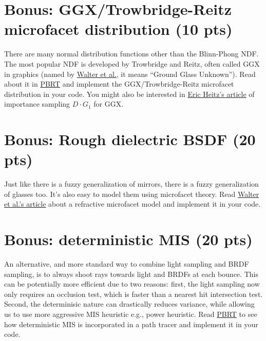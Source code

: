 \section{Bonus: GGX/Trowbridge-Reitz microfacet distribution (10 pts)}
There are many normal distribution functions other than the Blinn-Phong NDF. The most popular NDF is developed by Trowbridge and Reitz, often called GGX in graphics (named by \href{http://www.graphics.cornell.edu/~bjw/microfacetbsdf.pdf}{Walter et al.}, it means ``Ground Glass Unknown''). Read about it in \href{https://www.pbr-book.org/3ed-2018/Reflection_Models/Microfacet_Models#MicrofacetDistributionFunctions}{PBRT} and implement the GGX/Trowbridge-Reitz microfacet distribution in your code. You might also be interested in \href{https://jcgt.org/published/0007/04/01/}{Eric Heitz's article} of importance sampling $D \cdot G_1$ for GGX.

\section{Bonus: Rough dielectric BSDF (20 pts)}
Just like there is a fuzzy generalization of mirrors, there is a fuzzy generalization of glasses too. It's also easy to model them using microfacet theory. Read \href{http://www.graphics.cornell.edu/~bjw/microfacetbsdf.pdf}{Walter et al.'s article} about a refractive microfacet model and implement it in your code.

\section{Bonus: deterministic MIS (20 pts)}
An alternative, and more standard way to combine light sampling and BRDF sampling, is to always shoot rays towards light and BRDFs at each bounce. This can be potentially more efficient due to two reasons: first, the light sampling now only requires an occlusion test, which is faster than a nearest hit intersection test. Second, the determinisic nature can drastically reduces variance, while allowing us to use more aggressive MIS heuristic e.g., power heuristic. Read \href{https://www.pbr-book.org/3ed-2018/Light_Transport_I_Surface_Reflection/Path_Tracing}{PBRT} to see how deterministic MIS is incorporated in a path tracer and implement it in your code.

%
%


